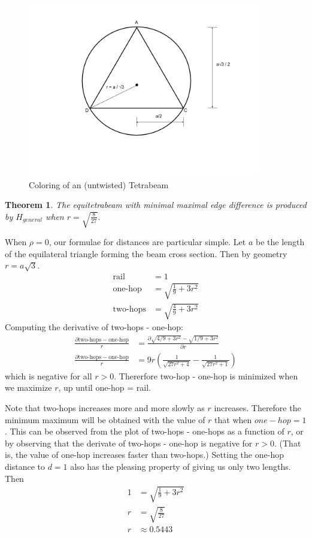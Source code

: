 \documentclass[11pt]{article}
\newtheorem{theorem}{Theorem}
\begin{document}
 \begin{figure}[H]
     \centering
     \includegraphics[width=0.9\textwidth]{figures/EquilateralDiagram.png}
     \caption{Coloring of an (untwisted) Tetrabeam}
 \end{figure}


\begin{theorem}
The equitetrabeam with minimal maximal edge difference is produced by $H_{general}$ when $ r = \sqrt{\frac{8}{27}} $.
  \end{theorem}

When $\rho = 0$, our formulae for distances are particular simple. Let $a$ be the length of the equilateral triangle
forming the beam cross section. Then by geometry $r = a \sqrt{3}$.
\begin{align*}
  \text{rail} &=  1 \\
  \text{one-hop} &= \sqrt{\frac{1}{9} + 3r^2}\\
\text{two-hops}    &= \sqrt{\frac{4}{9} + 3r^2}
\end{align*}
Computing the derivative of two-hops - one-hop:
\begin{align*}
 \frac{\partial \text{two-hops} - \text{one-hop}}{r} &= \frac{\partial \sqrt{4/9 + 3r^2} - \sqrt{1/9 + 3r^2}}{\partial r} \\
  \frac{\partial \text{two-hops} - \text{one-hop}}{r} &= 9r (\frac{1}{\sqrt{27r^2 + 4}} - \frac{1}{\sqrt{ 27r^2 + 1}}) 
\end{align*}
which is negative for all $r> 0$. Thererfore two-hop - one-hop
is minimized when we maximize $r$, up until one-hop = rail.

Note that two-hops increases more and more slowly as $r$ increases. Therefore the minimum maximum will
be obtained with the value of $r$ that when $one-hop = 1$. This can be observed from the
plot of two-hops - one-hops as a function of $r$, or by observing that the derivate of two-hops - one-hop
is negative for $r > 0$. (That is, the value of one-hop increases faster than two-hops.) 
Setting the one-hop distance to $d = 1$ also has the pleasing property of giving us only two lengths. Then
\begin{align*}
   1  &=  \sqrt{\frac{1}{9} + 3r^2} \\
   r  &= \sqrt{\frac{8}{27}} \\
   r &\approx 0.5443
\end{align*}
\end{document}
